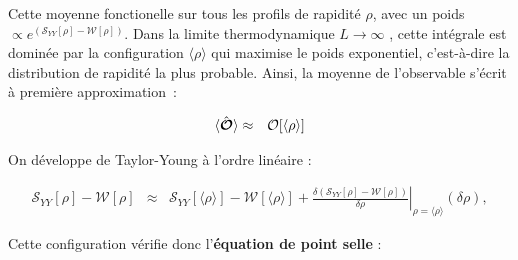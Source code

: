 

Cette moyenne fonctionelle sur tous les profils de rapidité $\rho$, avec un poids $\propto e^{(\mathcal{S}_{YY}[\rho] - \mathcal{W}[\rho])}$. Dans la limite thermodynamique $L \to \infty$ , cette intégrale est dominée par la configuration $\langle \rho \rangle$ qui maximise le poids exponentiel, c’est-à-dire la distribution de rapidité la plus probable. Ainsi, la moyenne de l’observable s’écrit à première approximation :


\begin{eqnarray}
	\langle \hat{\bm{\mathcal{O}}} \rangle & \approx & \mathcal{O}[\langle \rho \rangle ]	
	\label{chap:TBA:eq:ensemble_average:approx}
\end{eqnarray}


On développe de Taylor-Young à l’ordre linéaire :

\begin{eqnarray*}
	\mathcal{S}_{YY}[\rho] - \mathcal{W}[\rho] & \approx & \mathcal{S}_{YY}[\langle\rho\rangle] - \mathcal{W}[\langle\rho\rangle] +  \left. \frac{\delta (\mathcal{S}_{YY}[\rho] - \mathcal{W}[\rho]) }{\delta \rho} \right|_{\rho = \langle \rho \rangle }	(\delta \rho),
	\label{chap:TBA:eq:action}	
\end{eqnarray*}	


Cette configuration vérifie donc l’{\bf équation de point selle} :

